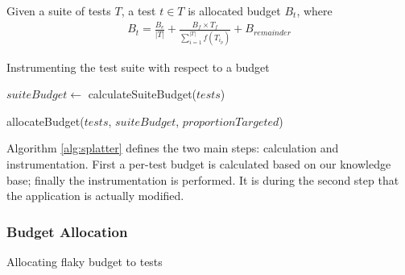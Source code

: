 {Given a suite of tests $T$, a test $t \in T$ is allocated budget $B_{t}$, where
\begin{align*}
B_t = \frac{B_e}{|T|} + \frac{B_f \times T_f}{\sum\limits_{i=1}^{|T|}
f(T_{i_p})} + B_{remainder}
\end{align*}

\begin{algorithm}[h]
\caption{Instrumenting the test suite with respect to a budget}
\label{alg:splatter}

\begin{algorithmic}
	\Statex


	\State $suiteBudget \gets$ calculateSuiteBudget($tests$)
	\Statex

	\State allocateBudget($tests$, $suiteBudget$, $proportionTargeted$)
	\Statex

	\EndFor

	\EndFunction

	\Statex


	\Statex


	\EndFunction
\end{algorithmic}

\end{algorithm}

Algorithm \ref{alg:splatter} defines the two main steps: calculation and
instrumentation. First a per-test budget is calculated based on our knowledge
base; finally the instrumentation is performed. It is during the second step
that the application is actually modified.

\subsubsection{\Flaky Budget Allocation}
\label{sec:sec:flaky_budget_alloc}

\begin{algorithm}[H]
\caption{Allocating flaky budget to tests}
\label{alg:allocateFlakyBudget}


\end{algorithm}}
